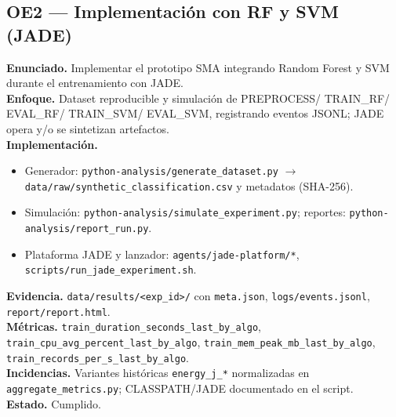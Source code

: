 \subsection*{OE2 — Implementación con RF y SVM (JADE)}
\textbf{Enunciado.} Implementar el prototipo SMA integrando Random Forest y SVM durante el entrenamiento con JADE.\\
\textbf{Enfoque.} Dataset reproducible y simulación de PREPROCESS/ TRAIN\_RF/ EVAL\_RF/ TRAIN\_SVM/ EVAL\_SVM, registrando eventos JSONL; JADE opera y/o se sintetizan artefactos.\\
\textbf{Implementación.}
\begin{itemize}
  \item Generador: \texttt{python-analysis/generate\_dataset.py} $\rightarrow$ \texttt{data/raw/synthetic\_classification.csv} y metadatos (SHA-256).
  \item Simulación: \texttt{python-analysis/simulate\_experiment.py}; reportes: \texttt{python-analysis/report\_run.py}.
  \item Plataforma JADE y lanzador: \texttt{agents/jade-platform/*}, \texttt{scripts/run\_jade\_experiment.sh}.
\end{itemize}
\textbf{Evidencia.} \texttt{data/results/\textless exp\_id\textgreater/} con \texttt{meta.json}, \texttt{logs/events.jsonl}, \texttt{report/report.html}.\\
\textbf{Métricas.} \texttt{train\_duration\_seconds\_last\_by\_algo}, \texttt{train\_cpu\_avg\_percent\_last\_by\_algo}, \texttt{train\_mem\_peak\_mb\_last\_by\_algo}, \texttt{train\_records\_per\_s\_last\_by\_algo}.\\
\textbf{Incidencias.} Variantes históricas \texttt{energy\_j\_*} normalizadas en \texttt{aggregate\_metrics.py}; CLASSPATH/JADE documentado en el script.\\
\textbf{Estado.} Cumplido.

